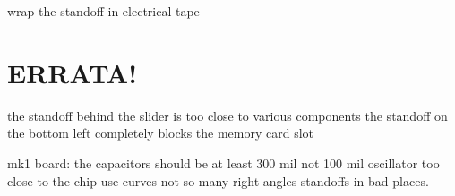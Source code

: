 \documentclass[11pt]{article}
\begin{document}
	wrap the standoff in electrical tape

\section{ERRATA!}

the standoff behind the slider is too close to various components
the standoff on the bottom left completely blocks the memory card slot

mk1 board:
the capacitors should be at least 300 mil not 100 mil
oscillator too close to the chip
use curves not so many right angles
standoffs in bad places.
\end{document}
